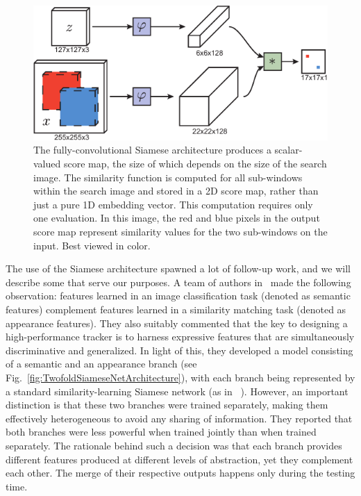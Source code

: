 \begin{figure}[t]
    \centerline{\includegraphics[width=0.7\linewidth]{figures/theoretical_foundations/fully_cnn_siam_tracking_architecture.pdf}}
    \caption[ architecture]{The fully-convolutional Siamese architecture produces a scalar-valued score map, the size of which depends on the size of the search image. The similarity function is computed for all sub-windows within the search image and stored in a 2D score map, rather than just a pure 1D embedding vector. This computation requires only one evaluation. In this image, the red and blue pixels in the output score map represent similarity values for the two sub-windows on the input. Best viewed in color. }
    \label{fig:FullyCNNSiamTrackingArch}
\end{figure}

The use of the Siamese architecture spawned a lot of follow-up work, and we will describe some that serve our purposes. A team of authors in~\cite{he2018twofoldsiam} made the following observation: features learned in an image classification task (denoted as semantic features) complement features learned in a similarity matching task (denoted as appearance features). They also suitably commented that the key to designing a high-performance tracker is to harness expressive features that are simultaneously discriminative and generalized. In light of this, they developed a model consisting of a semantic and an appearance branch (see Fig.~\ref{fig:TwofoldSiameseNetArchitecture}), with each branch being represented by a standard similarity-learning Siamese network (as in ~\cite{bertinetto2016siamfc}). However, an important distinction is that these two branches were trained separately, making them effectively heterogeneous to avoid any sharing of information. They reported that both branches were less powerful when trained jointly than when trained separately. The rationale behind such a decision was that each branch provides different features produced at different levels of abstraction, yet they complement each other. The merge of their respective outputs happens only during the testing time.

